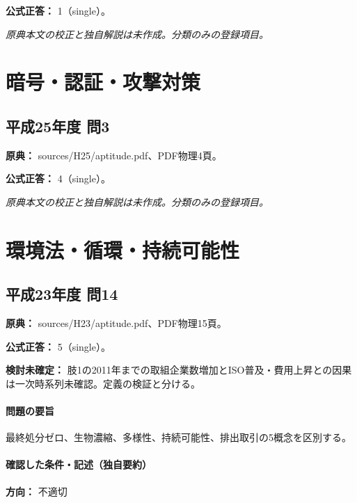 \textbf{公式正答：} 1（single）。

\par\textit{原典本文の校正と独自解説は未作成。分類のみの登録項目。}

\section{暗号・認証・攻撃対策}

\subsection{平成25年度 問3}
\label{q:h25-reg-apt-03}

\noindent\textbf{原典：} sources/H25/aptitude.pdf、PDF物理4頁。

\textbf{公式正答：} 4（single）。

\par\textit{原典本文の校正と独自解説は未作成。分類のみの登録項目。}

\section{環境法・循環・持続可能性}

\subsection{平成23年度 問14}
\label{q:h23-reg-apt-14}

\noindent\textbf{原典：} sources/H23/aptitude.pdf、PDF物理15頁。

\textbf{公式正答：} 5（single）。

\par\textbf{検討未確定：} 肢1の2011年までの取組企業数増加とISO普及・費用上昇との因果は一次時系列未確認。定義の検証と分ける。

\paragraph{問題の要旨} 最終処分ゼロ、生物濃縮、多様性、持続可能性、排出取引の5概念を区別する。

\paragraph{確認した条件・記述（独自要約）}\mbox{}\par

\noindent\textbf{方向：} 不適切\par

